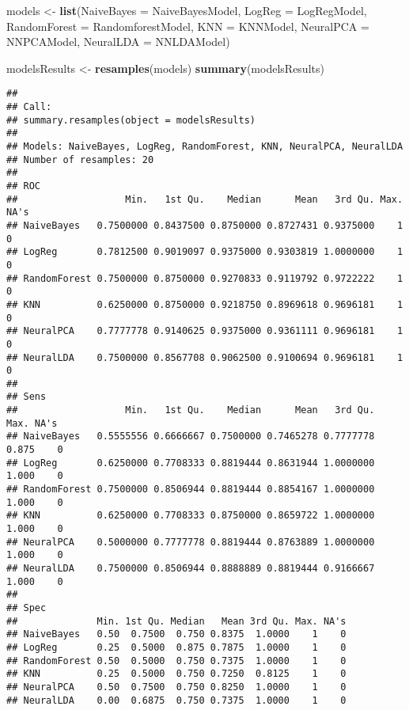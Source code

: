 \documentclass[
]{article}
\newenvironment{Shaded}{\begin{snugshade}}{\end{snugshade}}
\newcommand{\DataTypeTok}[1]{\textcolor[rgb]{0.13,0.29,0.53}{#1}}
\newcommand{\KeywordTok}[1]{\textcolor[rgb]{0.13,0.29,0.53}{\textbf{#1}}}
\newcommand{\NormalTok}[1]{#1}
\newcommand{\StringTok}[1]{\textcolor[rgb]{0.31,0.60,0.02}{#1}}
\begin{document}
\begin{Shaded}
\begin{Highlighting}[]
\NormalTok{models <-}\StringTok{ }\KeywordTok{list}\NormalTok{(}\DataTypeTok{NaiveBayes =}\NormalTok{ NaiveBayesModel, }
                    \DataTypeTok{LogReg =}\NormalTok{ LogRegModel,}
                    \DataTypeTok{RandomForest =}\NormalTok{ RandomforestModel,}
                    \DataTypeTok{KNN =}\NormalTok{ KNNModel,}
                    \DataTypeTok{NeuralPCA =}\NormalTok{ NNPCAModel,}
                    \DataTypeTok{NeuralLDA =}\NormalTok{ NNLDAModel)   }

\NormalTok{modelsResults <-}\StringTok{ }\KeywordTok{resamples}\NormalTok{(models)}
\KeywordTok{summary}\NormalTok{(modelsResults)}
\end{Highlighting}
\end{Shaded}

\begin{verbatim}
## 
## Call:
## summary.resamples(object = modelsResults)
## 
## Models: NaiveBayes, LogReg, RandomForest, KNN, NeuralPCA, NeuralLDA 
## Number of resamples: 20 
## 
## ROC 
##                   Min.   1st Qu.    Median      Mean   3rd Qu. Max. NA's
## NaiveBayes   0.7500000 0.8437500 0.8750000 0.8727431 0.9375000    1    0
## LogReg       0.7812500 0.9019097 0.9375000 0.9303819 1.0000000    1    0
## RandomForest 0.7500000 0.8750000 0.9270833 0.9119792 0.9722222    1    0
## KNN          0.6250000 0.8750000 0.9218750 0.8969618 0.9696181    1    0
## NeuralPCA    0.7777778 0.9140625 0.9375000 0.9361111 0.9696181    1    0
## NeuralLDA    0.7500000 0.8567708 0.9062500 0.9100694 0.9696181    1    0
## 
## Sens 
##                   Min.   1st Qu.    Median      Mean   3rd Qu.  Max. NA's
## NaiveBayes   0.5555556 0.6666667 0.7500000 0.7465278 0.7777778 0.875    0
## LogReg       0.6250000 0.7708333 0.8819444 0.8631944 1.0000000 1.000    0
## RandomForest 0.7500000 0.8506944 0.8819444 0.8854167 1.0000000 1.000    0
## KNN          0.6250000 0.7708333 0.8750000 0.8659722 1.0000000 1.000    0
## NeuralPCA    0.5000000 0.7777778 0.8819444 0.8763889 1.0000000 1.000    0
## NeuralLDA    0.7500000 0.8506944 0.8888889 0.8819444 0.9166667 1.000    0
## 
## Spec 
##              Min. 1st Qu. Median   Mean 3rd Qu. Max. NA's
## NaiveBayes   0.50  0.7500  0.750 0.8375  1.0000    1    0
## LogReg       0.25  0.5000  0.875 0.7875  1.0000    1    0
## RandomForest 0.50  0.5000  0.750 0.7375  1.0000    1    0
## KNN          0.25  0.5000  0.750 0.7250  0.8125    1    0
## NeuralPCA    0.50  0.7500  0.750 0.8250  1.0000    1    0
## NeuralLDA    0.00  0.6875  0.750 0.7375  1.0000    1    0
\end{verbatim}
\end{document}
